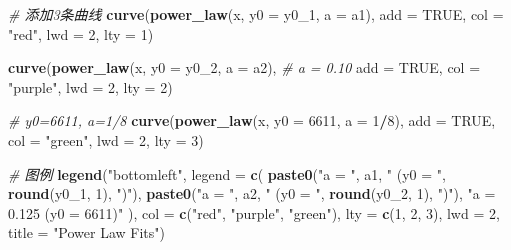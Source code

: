\documentclass[
]{article}
\newenvironment{Shaded}{\begin{snugshade}}{\end{snugshade}}
\newcommand{\AttributeTok}[1]{\textcolor[rgb]{0.13,0.29,0.53}{#1}}
\newcommand{\CommentTok}[1]{\textcolor[rgb]{0.56,0.35,0.01}{\textit{#1}}}
\newcommand{\ConstantTok}[1]{\textcolor[rgb]{0.56,0.35,0.01}{#1}}
\newcommand{\DecValTok}[1]{\textcolor[rgb]{0.00,0.00,0.81}{#1}}
\newcommand{\FunctionTok}[1]{\textcolor[rgb]{0.13,0.29,0.53}{\textbf{#1}}}
\newcommand{\NormalTok}[1]{#1}
\newcommand{\SpecialCharTok}[1]{\textcolor[rgb]{0.81,0.36,0.00}{\textbf{#1}}}
\newcommand{\StringTok}[1]{\textcolor[rgb]{0.31,0.60,0.02}{#1}}
\begin{document}
\begin{Shaded}
\begin{Highlighting}[]
\CommentTok{\# 添加3条曲线}
\FunctionTok{curve}\NormalTok{(}\FunctionTok{power\_law}\NormalTok{(x, }\AttributeTok{y0 =}\NormalTok{ y0\_1, }\AttributeTok{a =}\NormalTok{ a1),  }
      \AttributeTok{add =} \ConstantTok{TRUE}\NormalTok{, }\AttributeTok{col =} \StringTok{"red"}\NormalTok{, }\AttributeTok{lwd =} \DecValTok{2}\NormalTok{, }\AttributeTok{lty =} \DecValTok{1}\NormalTok{)}


\FunctionTok{curve}\NormalTok{(}\FunctionTok{power\_law}\NormalTok{(x, }\AttributeTok{y0 =}\NormalTok{ y0\_2, }\AttributeTok{a =}\NormalTok{ a2),  }\CommentTok{\# a = 0.10}
      \AttributeTok{add =} \ConstantTok{TRUE}\NormalTok{, }\AttributeTok{col =} \StringTok{"purple"}\NormalTok{, }\AttributeTok{lwd =} \DecValTok{2}\NormalTok{, }\AttributeTok{lty =} \DecValTok{2}\NormalTok{)}

\CommentTok{\# y0=6611, a=1/8}
\FunctionTok{curve}\NormalTok{(}\FunctionTok{power\_law}\NormalTok{(x, }\AttributeTok{y0 =} \DecValTok{6611}\NormalTok{, }\AttributeTok{a =} \DecValTok{1}\SpecialCharTok{/}\DecValTok{8}\NormalTok{),  }
      \AttributeTok{add =} \ConstantTok{TRUE}\NormalTok{, }\AttributeTok{col =} \StringTok{"green"}\NormalTok{, }\AttributeTok{lwd =} \DecValTok{2}\NormalTok{, }\AttributeTok{lty =} \DecValTok{3}\NormalTok{)}

\CommentTok{\# 图例}
\FunctionTok{legend}\NormalTok{(}\StringTok{"bottomleft"}\NormalTok{,               }
       \AttributeTok{legend =} \FunctionTok{c}\NormalTok{(                 }
         \FunctionTok{paste0}\NormalTok{(}\StringTok{"a = "}\NormalTok{, a1, }\StringTok{" (y0 = "}\NormalTok{, }\FunctionTok{round}\NormalTok{(y0\_1, }\DecValTok{1}\NormalTok{), }\StringTok{")"}\NormalTok{), }
         \FunctionTok{paste0}\NormalTok{(}\StringTok{"a = "}\NormalTok{, a2, }\StringTok{" (y0 = "}\NormalTok{, }\FunctionTok{round}\NormalTok{(y0\_2, }\DecValTok{1}\NormalTok{), }\StringTok{")"}\NormalTok{),}
         \StringTok{"a = 0.125 (y0 = 6611)"}  
\NormalTok{       ),}
       \AttributeTok{col =} \FunctionTok{c}\NormalTok{(}\StringTok{"red"}\NormalTok{, }\StringTok{"purple"}\NormalTok{, }\StringTok{"green"}\NormalTok{),  }
       \AttributeTok{lty =} \FunctionTok{c}\NormalTok{(}\DecValTok{1}\NormalTok{, }\DecValTok{2}\NormalTok{, }\DecValTok{3}\NormalTok{),                  }
       \AttributeTok{lwd =} \DecValTok{2}\NormalTok{,                  }
       \AttributeTok{title =} \StringTok{"Power Law Fits"}\NormalTok{) }
\end{Highlighting}
\end{Shaded}
\end{document}
